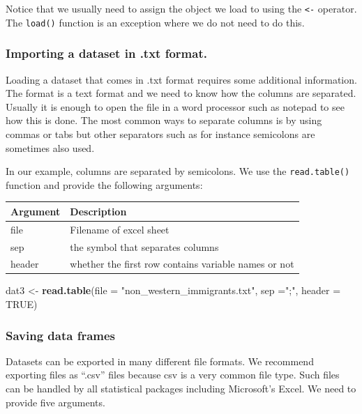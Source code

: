 \documentclass[]{article}
\newenvironment{Shaded}{\begin{snugshade}}{\end{snugshade}}
\newcommand{\DataTypeTok}[1]{\textcolor[rgb]{0.13,0.29,0.53}{#1}}
\newcommand{\KeywordTok}[1]{\textcolor[rgb]{0.13,0.29,0.53}{\textbf{#1}}}
\newcommand{\NormalTok}[1]{#1}
\newcommand{\OtherTok}[1]{\textcolor[rgb]{0.56,0.35,0.01}{#1}}
\newcommand{\StringTok}[1]{\textcolor[rgb]{0.31,0.60,0.02}{#1}}
\begin{document}
Notice that we usually need to assign the object we load to using the \texttt{\textless{}-} operator. The \texttt{load()} function is an exception where we do not need to do this.

\hypertarget{importing-a-dataset-in-.txt-format.}{%
\subsubsection{Importing a dataset in .txt format.}\label{importing-a-dataset-in-.txt-format.}}

Loading a dataset that comes in .txt format requires some additional information. The format is a text format and we need to know how the columns are separated. Usually it is enough to open the file in a word processor such as notepad to see how this is done. The most common ways to separate columns is by using commas or tabs but other separators such as for instance semicolons are sometimes also used.

In our example, columns are separated by semicolons. We use the \texttt{read.table()} function and provide the following arguments:

\begin{longtable}[]{@{}ll@{}}
\toprule
Argument & Description\tabularnewline
\midrule
\endhead
file & Filename of excel sheet\tabularnewline
sep & the symbol that separates columns\tabularnewline
header & whether the first row contains variable names or not\tabularnewline
\bottomrule
\end{longtable}

\begin{Shaded}
\begin{Highlighting}[]
\NormalTok{dat3 <-}\StringTok{ }\KeywordTok{read.table}\NormalTok{(}\DataTypeTok{file =} \StringTok{"non_western_immigrants.txt"}\NormalTok{, }\DataTypeTok{sep =}\StringTok{";"}\NormalTok{, }\DataTypeTok{header =} \OtherTok{TRUE}\NormalTok{)}
\end{Highlighting}
\end{Shaded}

\hypertarget{saving-data-frames}{%
\subsubsection{Saving data frames}\label{saving-data-frames}}

Datasets can be exported in many different file formats. We recommend exporting files as ``.csv'' files because csv is a very common file type. Such files can be handled by all statistical packages including Microsoft's Excel. We need to provide five arguments.
\end{document}
